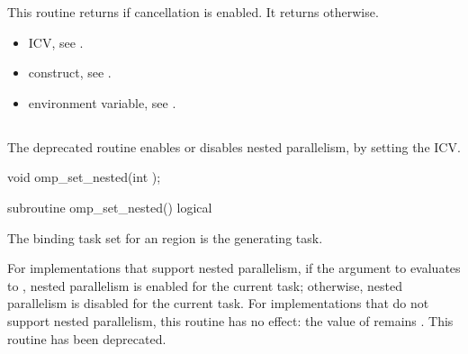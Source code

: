 \effect
This routine returns  if cancellation is enabled. It returns  otherwise.

\crossreferences
\begin{itemize}
\item {} ICV, see
.

\item {} construct, see .

\item {} environment variable, see
.
\end{itemize}









\subsection{}
\label{subsec:omp_set_nested}
\summary
The deprecated  routine enables or disables nested parallelism, by setting the
 ICV.


\format
\begin{ccppspecific}
\begin{ompcFunction}
void omp_set_nested(int );
\end{ompcFunction}
\end{ccppspecific}

\begin{fortranspecific}
\begin{ompfSubroutine}
subroutine omp_set_nested()
logical 
\end{ompfSubroutine}
\end{fortranspecific}

\binding
The binding task set for an  region is the generating task.

\effect
For implementations that support nested parallelism, if the argument to
 evaluates to , nested parallelism is enabled for the current task;
otherwise, nested parallelism is disabled for the current task. For implementations that
do not support nested parallelism, this routine has no effect: the value of 
remains . This routine has been deprecated.

